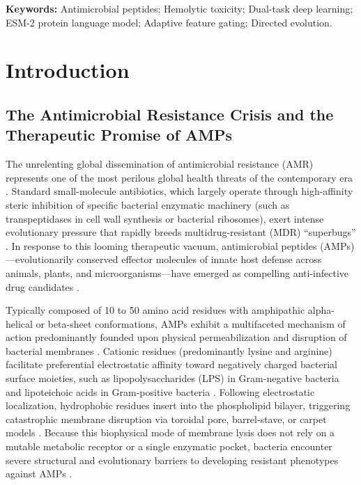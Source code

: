 \documentclass[11pt,a4paper]{article}
\begin{document}
\begin{abstract}
\textbf{Conclusion and Availability:} SafeAMP-Dual presents a robust, computationally efficient, and interpretable computational paradigm that bridges the long-standing dichotomy between antimicrobial discovery and safety profiling. An open-access web server and modular Python codebase are publicly available at \url{https://github.com/computbiol/SafeAMP-Dual}.
\end{abstract}

\textbf{Keywords:} Antimicrobial peptides; Hemolytic toxicity; Dual-task deep learning; ESM-2 protein language model; Adaptive feature gating; Directed evolution.

\newpage

\section{Introduction}

\subsection{The Antimicrobial Resistance Crisis and the Therapeutic Promise of AMPs}
The unrelenting global dissemination of antimicrobial resistance (AMR) represents one of the most perilous global health threats of the contemporary era \cite{murray2022global, who2021amr}. Standard small-molecule antibiotics, which largely operate through high-affinity steric inhibition of specific bacterial enzymatic machinery (such as transpeptidases in cell wall synthesis or bacterial ribosomes), exert intense evolutionary pressure that rapidly breeds multidrug-resistant (MDR) ``superbugs'' \cite{zasloff2002antimicrobial}. In response to this looming therapeutic vacuum, antimicrobial peptides (AMPs)---evolutionarily conserved effector molecules of innate host defense across animals, plants, and microorganisms---have emerged as compelling anti-infective drug candidates \cite{hancock2006antimicrobial, mahlapuu2016antimicrobial}.

Typically composed of 10 to 50 amino acid residues with amphipathic alpha-helical or beta-sheet conformations, AMPs exhibit a multifaceted mechanism of action predominantly founded upon physical permeabilization and disruption of bacterial membranes \cite{fjell2012designing, boman2003antibacterial}. Cationic residues (predominantly lysine and arginine) facilitate preferential electrostatic affinity toward negatively charged bacterial surface moieties, such as lipopolysaccharides (LPS) in Gram-negative bacteria and lipoteichoic acids in Gram-positive bacteria \cite{zasloff2002antimicrobial, matsuzaki1999why}. Following electrostatic localization, hydrophobic residues insert into the phospholipid bilayer, triggering catastrophic membrane disruption via toroidal pore, barrel-stave, or carpet models \cite{raghuraman2007melittin, oren1997selective}. Because this biophysical mode of membrane lysis does not rely on a mutable metabolic receptor or a single enzymatic pocket, bacteria encounter severe structural and evolutionary barriers to developing resistant phenotypes against AMPs \cite{marr2006antibacterial, muller2016therapeutic}.
\end{document}
